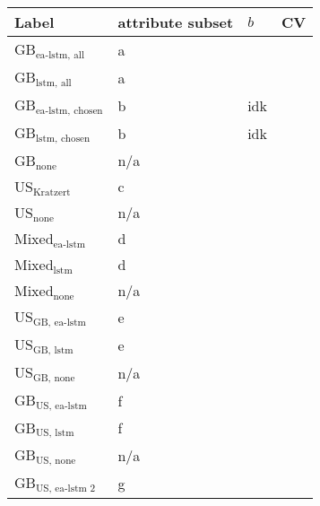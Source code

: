 \begin{tabular}{llll}
    \hline
    Label & attribute subset & $b$ & CV \\
    \hline
    GB$_\text{ea-lstm, all}$ & a  &  \\
    GB$_\text{lstm, all}$ & a &  \\
    GB$_\text{ea-lstm, chosen}$ & b & idk \\
    GB$_\text{lstm, chosen}$ & b & idk \\
    GB$_\text{none}$ & n/a\\
    US$_\text{Kratzert}$  & c \\
    US$_\text{none}$  & n/a \\
    Mixed$_\text{ea-lstm}$ & d \\
    Mixed$_\text{lstm}$ & d \\
    Mixed$_\text{none}$ & n/a \\
    US$_\text{GB, ea-lstm}$ & e \\
    US$_\text{GB, lstm}$  & e\\
    US$_\text{GB, none}$ & n/a \\
    GB$_\text{US, ea-lstm}$ & f \\
    GB$_\text{US, lstm}$  & f \\ 
    GB$_\text{US, none}$  & n/a \\
    GB$_\text{US, ea-lstm 2}$ & g \\

\end{tabular}
